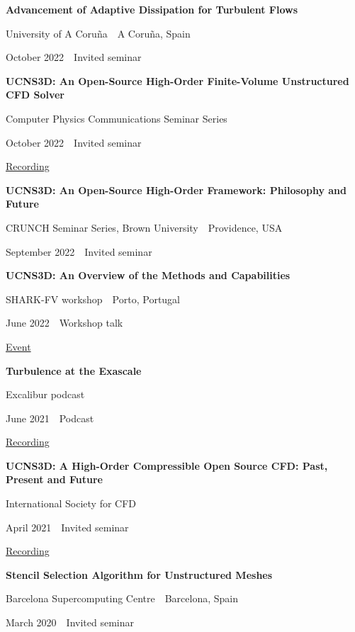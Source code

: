 \documentclass[11pt,a4paper]{article}
\newlength{\cventrysep}
\newenvironment{cventry}{%
  \par\noindent\begin{minipage}{\linewidth}
  \RaggedRight\fontsize{9.8}{12.5}\selectfont
}{\end{minipage}\par\addvspace{\cventrysep}}
\newcommand{\cvtitle}[1]{{\bfseries #1\par}\vspace{1pt}}
\newcommand{\cvdetail}[1]{{#1\par}\vspace{1pt}}
\newcommand{\cvmeta}[1]{{\fontsize{9}{11.5}\selectfont\color{Muted}#1\par}\vspace{1pt}}
\newcommand{\cvlinks}[1]{{\fontsize{9}{11.5}\selectfont #1\par}}
\begin{document}
\begin{cventry}
\cvtitle{Advancement of Adaptive Dissipation for Turbulent Flows}
\cvdetail{University of A Coruña \,\textperiodcentered{}\, A Coruña, Spain}
\cvmeta{October 2022 \,\textperiodcentered{}\, Invited seminar}
\end{cventry}

\begin{cventry}
\cvtitle{UCNS3D: An Open-Source High-Order Finite-Volume Unstructured CFD Solver}
\cvdetail{Computer Physics Communications Seminar Series}
\cvmeta{October 2022 \,\textperiodcentered{}\, Invited seminar}
\cvlinks{\href{https://cassyni.com/events/8cngqLg9KGot2xMcdR3CH3}{Recording}}
\end{cventry}

\begin{cventry}
\cvtitle{UCNS3D: An Open-Source High-Order Framework: Philosophy and Future}
\cvdetail{CRUNCH Seminar Series, Brown University \,\textperiodcentered{}\, Providence, USA}
\cvmeta{September 2022 \,\textperiodcentered{}\, Invited seminar}
\end{cventry}

\begin{cventry}
\cvtitle{UCNS3D: An Overview of the Methods and Capabilities}
\cvdetail{SHARK-FV workshop \,\textperiodcentered{}\, Porto, Portugal}
\cvmeta{June 2022 \,\textperiodcentered{}\, Workshop talk}
\cvlinks{\href{https://shark-fv.eu/home-shark/}{Event}}
\end{cventry}

\begin{cventry}
\cvtitle{Turbulence at the Exascale}
\cvdetail{Excalibur podcast}
\cvmeta{June 2021 \,\textperiodcentered{}\, Podcast}
\cvlinks{\href{https://www.youtube.com/watch?v=Z-w4qeNR6pg}{Recording}}
\end{cventry}

\begin{cventry}
\cvtitle{UCNS3D: A High-Order Compressible Open Source CFD: Past, Present and Future}
\cvdetail{International Society for CFD}
\cvmeta{April 2021 \,\textperiodcentered{}\, Invited seminar}
\cvlinks{\href{https://www.youtube.com/watch?v=LGPYExd8XEo}{Recording}}
\end{cventry}

\begin{cventry}
\cvtitle{Stencil Selection Algorithm for Unstructured Meshes}
\cvdetail{Barcelona Supercomputing Centre \,\textperiodcentered{}\, Barcelona, Spain}
\cvmeta{March 2020 \,\textperiodcentered{}\, Invited seminar}
\end{cventry}
\end{document}
